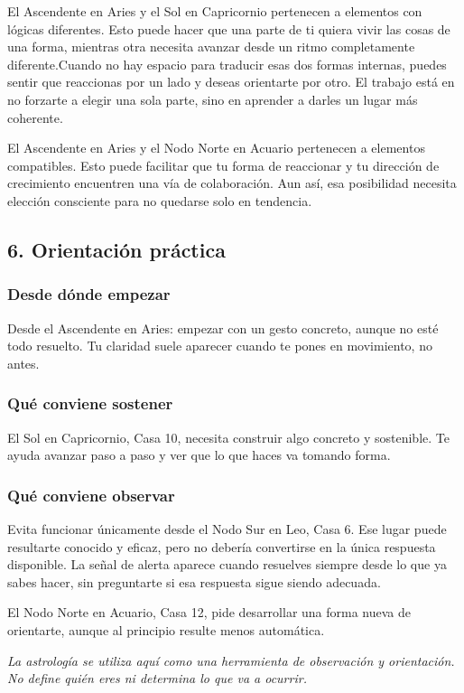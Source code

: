 \documentclass[11pt,a4paper]{article}
\begin{document}
El Ascendente en Aries y el Sol en Capricornio pertenecen a elementos con lógicas diferentes. Esto puede hacer que una parte de ti quiera vivir las cosas de una forma, mientras otra necesita avanzar desde un ritmo completamente diferente.Cuando no hay espacio para traducir esas dos formas internas, puedes sentir que reaccionas por un lado y deseas orientarte por otro. El trabajo está en no forzarte a elegir una sola parte, sino en aprender a darles un lugar más coherente.

El Ascendente en Aries y el Nodo Norte en Acuario pertenecen a elementos compatibles. Esto puede facilitar que tu forma de reaccionar y tu dirección de crecimiento encuentren una vía de colaboración. Aun así, esa posibilidad necesita elección consciente para no quedarse solo en tendencia.

\vspace{0.5cm}


\subsection{6. Orientación práctica}

\subsubsection*{Desde dónde empezar}
Desde el Ascendente en Aries: empezar con un gesto concreto, aunque no esté todo resuelto. Tu claridad suele aparecer cuando te pones en movimiento, no antes.

\subsubsection*{Qué conviene sostener}
El Sol en Capricornio, Casa 10, necesita construir algo concreto y sostenible. Te ayuda avanzar paso a paso y ver que lo que haces va tomando forma.

\subsubsection*{Qué conviene observar}
Evita funcionar únicamente desde el Nodo Sur en Leo, Casa 6. Ese lugar puede resultarte conocido y eficaz, pero no debería convertirse en la única respuesta disponible. La señal de alerta aparece cuando resuelves siempre desde lo que ya sabes hacer, sin preguntarte si esa respuesta sigue siendo adecuada.

El Nodo Norte en Acuario, Casa 12, pide desarrollar una forma nueva de orientarte, aunque al principio resulte menos automática.

\vspace{1cm}

\begin{center}
{\small\itshape\color{grisai}
La astrología se utiliza aquí como una herramienta de observación y orientación.
No define quién eres ni determina lo que va a ocurrir.
}
\end{center}
\end{document}
